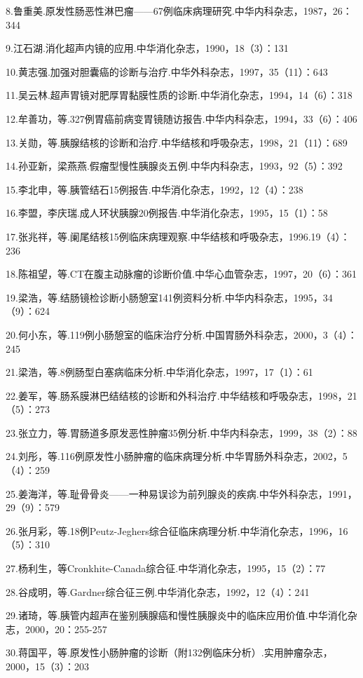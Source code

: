 8.鲁重美.原发性肠恶性淋巴瘤------67例临床病理研究.中华内科杂志，1987，26：344

9.江石湖.消化超声内镜的应用.中华消化杂志，1990，18（3）：131

10.黄志强.加强对胆囊癌的诊断与治疗.中华外科杂志，1997，35（11）：643

11.吴云林.超声胃镜对肥厚胃黏膜性质的诊断.中华消化杂志，1994，14（6）：318

12.牟善功，等.327例胃癌前病变胃镜随访报告.中华内科杂志，1994，33（6）：406

13.关勋，等.胰腺结核的诊断和治疗.中华结核和呼吸杂志，1998，21（11）：689

14.孙亚新，梁燕燕.假瘤型慢性胰腺炎五例.中华内科杂志，1993，92（5）：392

15.李北申，等.胰管结石15例报告.中华消化杂志，1992，12（4）：238

16.李盟，李庆瑞.成人环状胰腺20例报告.中华消化杂志，1995，15（1）：58

17.张兆祥，等.阑尾结核15例临床病理观察.中华结核和呼吸杂志，1996.19（4）：236

18.陈祖望，等.CT在腹主动脉瘤的诊断价值.中华心血管杂志，1997，20（6）：361

19.梁浩，等.结肠镜检诊断小肠憩室141例资料分析.中华内科杂志，1995，34（9）：624

20.何小东，等.119例小肠憩室的临床治疗分析.中国胃肠外科杂志，2000，3（4）：245

21.梁浩，等.8例肠型白塞病临床分析.中华消化杂志，1997，17（1）：61

22.姜军，等.肠系膜淋巴结结核的诊断和外科治疗.中华结核和呼吸杂志，1998，21（5）：273

23.张立力，等.胃肠道多原发恶性肿瘤35例分析.中华内科杂志，1999，38（2）：88

24.刘彤，等.116例原发性小肠肿瘤的临床病理分析.中华胃肠外科杂志，2002，5（4）：259

25.姜海洋，等.耻骨骨炎------一种易误诊为前列腺炎的疾病.中华外科杂志，1991，29（9）：579

26.张月彩，等.18例Peutz-Jeghers综合征临床病理分析.中华消化杂志，1996，16（5）：310

27.杨利生，等Cronkhite-Canada综合征.中华消化杂志，1995，15（2）：77

28.谷成明，等.Gardner综合征三例.中华消化杂志，1992，12（4）：241

29.诸琦，等.胰管内超声在鉴别胰腺癌和慢性胰腺炎中的临床应用价值.中华消化杂志，2000，20：255-257

30.蒋国平，等.原发性小肠肿瘤的诊断（附132例临床分析）.实用肿瘤杂志，2000，15（3）：203


